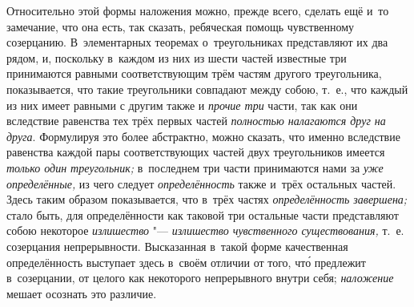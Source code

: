 Относительно этой формы наложения можно, прежде всего, сделать ещё и~то
замечание, что она есть, так сказать, ребяческая помощь чувственному
созерцанию. В~элементарных теоремах о~треугольниках представляют их два рядом,
и, поскольку в~каждом из них из шести частей известные три принимаются равными
соответствующим трём частям другого треугольника, показывается, что такие
треугольники совпадают между собою, т.~е., что каждый из них имеет равными с
другим также и {\em прочие три} части, так как они вследствие равенства тех
трёх первых частей {\em полностью налагаются друг на друга}. Формулируя это
более абстрактно, можно сказать, что именно вследствие равенства каждой пары
соответствующих частей двух треугольников имеется {\em только один
треугольник;} в~последнем три части принимаются нами за {\em уже определённые,}
из чего следует {\em определённость} также и~трёх остальных частей. Здесь таким
образом показывается, что в~трёх частях {\em определённость завершена;} стало
быть, для определённости как таковой три остальные части представляют собою
некоторое {\em излишество} "--- {\em излишество чувственного существования,}
т.~е. созерцания непрерывности. Высказанная в~такой форме качественная
определённость выступает здесь в~своём отличии от того, чт\'{о} предлежит
в~созерцании, от целого как некоторого непрерывного внутри себя;
{\em наложение} мешает осознать это различие.

